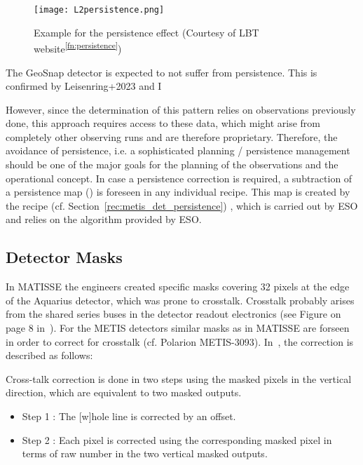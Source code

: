 \begin{figure}[ht]
  \centering
  \texttt{[image: L2persistence.png]}
  \caption[Persistence example]{Example for the persistence effect (Courtesy
    of LBT website\textsuperscript{\ref{fn:persistence}})}
  \label{fig:h2rg_persistence}
\end{figure}

The GeoSnap detector is expected to not suffer from persistence.
This is confirmed by 
Leisenring+2023 and I 

However, since the determination of this pattern relies on observations previously done, this approach requires access to these data, which might arise from completely other observing runs and are therefore proprietary.
Therefore, the avoidance of persistence, i.e. a sophisticated planning / persistence management should be one of the major goals for the planning of the observations and the operational concept.
In case a persistence correction is required, a subtraction of a persistence map (\hyperref[dataitem:persistence_map]{}) is foreseen in any individual recipe. This map is created by the recipe \hyperref[rec:metis_det_persistence]{} (cf. Section~\ref{rec:metis_det_persistence}) , which is carried out by \ac{ESO} and relies on the algorithm provided by \ac{ESO}.



\subsection{Detector Masks}\label{ssec:criticaldetetctormasks}

In MATISSE the engineers created specific masks covering 32 pixels at the edge of the Aquarius detector, which was prone to crosstalk.
Crosstalk probably arises from the shared series buses in the detector readout electronics (see Figure on page 8 in~\cite{matisse_minutes}).
For the METIS detectors similar masks as in MATISSE are forseen in order to correct for crosstalk (cf. Polarion METIS-3093).
In~\cite{matisse_minutes}, the correction is described as follows:

\begin{displayquote}
    Cross-talk correction is done in two steps using the masked pixels in the vertical direction, which are equivalent to two masked outputs.
    \begin{itemize}
        \item Step 1 : The [w]hole line is corrected by an offset.
        \item Step 2 : Each pixel is corrected using the corresponding masked pixel in terms of raw
            number in the two vertical masked outputs.
    \end{itemize}
\end{displayquote}

